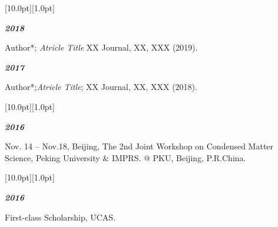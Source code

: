 \documentclass[12pt,a4paper,utf8]{report}
\begin{document}
\begin{minipage}[t]{16cm}
    \colorbox{subtitlecolor}{\raisebox{0pt}[10.0pt][1.0pt]{
        \textcolor{white}{\textsf{}}}}
\end{minipage}\par
\vspace{0.2cm}\hspace{0.5cm}
\begin{minipage}[t]{15cm}
    {\textbf{\em{2018}}}\par
    \quad Author*; {\em{Atricle Title}} XX Journal, XX, XXX (2019).\par
    \vspace{0.2cm}
    {\textbf{\em{2017}}}\par
    \quad Author*;{\em{Atricle Title}}; XX Journal, XX, XXX (2018).\par
\end{minipage}\par
\vspace{0.4cm}

\begin{minipage}[t]{16cm}
    \colorbox{subtitlecolor}{\raisebox{0pt}[10.0pt][1.0pt]{
        \textcolor{white}{\textsf{}}}}
\end{minipage}\par
\vspace{0.2cm}\hspace{0.5cm}
\begin{minipage}[t]{15cm}
    {\textbf{\em{2016}}}\par
    \quad Nov. 14 -- Nov.18, Beijing, The 2nd Joint Workshop on Condensed Matter Science, Peking University \& IMPRS. @ PKU, Beijing, P.R.China.\par
    \vspace{0.2cm}
\end{minipage}\par
\vspace{0.4cm}

\begin{minipage}[t]{16cm}
    \colorbox{subtitlecolor}{\raisebox{0pt}[10.0pt][1.0pt]{
        \textcolor{white}{\textsf{}}}}
\end{minipage}\par
\vspace{0.2cm}\hspace{0.5cm}
\begin{minipage}[t]{15cm}
    {\textbf{\em{2016}}}\par
    \quad First-class Scholarship, UCAS.\par
    \vspace{0.2cm}
\end{minipage}\par
\vspace{0.4cm}

\begin{center}\vspace{1.0cm}
\end{center}
\end{document}
